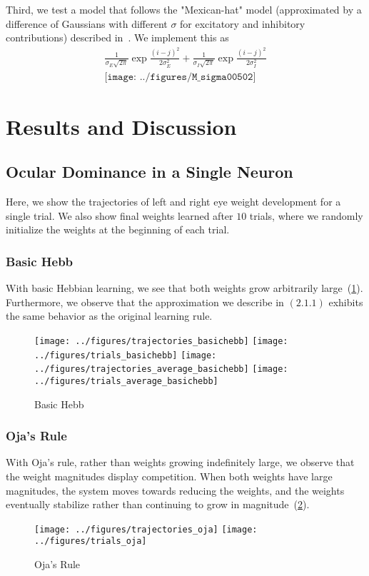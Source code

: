 \documentclass[pageno]{mat323paper}
\begin{document}
Third, we test a model that follows the "Mexican-hat" model (approximated by a difference of Gaussians with different $\sigma$ for excitatory and inhibitory contributions) described in~\cite{toyoizumi_equalization_2009}. We implement this as 
\begin{align}
\frac{1}{\sigma_E\sqrt{2\pi}}\exp{\frac{(i-j)^2}{2\sigma_E^2}}+\frac{1}{\sigma_I\sqrt{2\pi}}\exp{\frac{(i-j)^2}{2\sigma_I^2}}\\
\texttt{[image: ../figures/M\_sigma00502]}
\end{align}

\section{Results and Discussion}
\subsection{Ocular Dominance in a Single Neuron}
Here, we show the trajectories of left and right eye weight development for a single trial. We also show final weights learned after $10$ trials, where we randomly initialize the weights at the beginning of each trial.

\subsubsection{Basic Hebb}
With basic Hebbian learning, we see that both weights grow arbitrarily large~(\ref{fig:hebb}). Furthermore, we observe that the approximation we describe in $(2.1.1)$ exhibits the same behavior as the original learning rule.
\begin{figure}[h]
\texttt{[image: ../figures/trajectories\_basichebb]}
\texttt{[image: ../figures/trials\_basichebb]}
\texttt{[image: ../figures/trajectories\_average\_basichebb]}
\texttt{[image: ../figures/trials\_average\_basichebb]}
\caption{Basic Hebb}
\label{fig:hebb}
\end{figure}

\subsubsection{Oja's Rule}
With Oja's rule, rather than weights growing indefinitely large, we observe that the weight magnitudes display competition. When both weights have large magnitudes, the system moves towards reducing the weights, and the weights eventually stabilize rather than continuing to grow in magnitude~(\ref{fig:oja}).
\begin{figure}[h]
\texttt{[image: ../figures/trajectories\_oja]}
\texttt{[image: ../figures/trials\_oja]}
\caption{Oja's Rule}
\label{fig:oja}
\end{figure}
\end{document}
